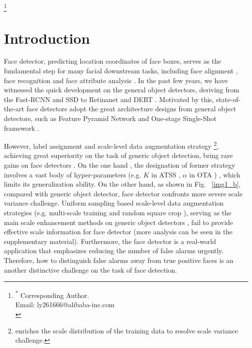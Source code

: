 \documentclass[10pt,twocolumn,letterpaper]{article}
\newcommand\blfootnote[1]{\begingroup
\renewcommand\thefootnote{}\footnote{#1}\addtocounter{footnote}{-1}\endgroup
}
\begin{document}
\blfootnote{\textsuperscript{*} Corresponding Author. \\
\qquad Email:  ly261666@alibaba-inc.com\\
} 
\section{Introduction}

\label{sec:introduction}
Face detector, predicting location coordinates of face boxes, serves as the fundamental step for many facial downstream tasks, including face alignment \cite{bulat2017far}, face recognition \cite{deng1801arcface} \cite{wang2021efficient} and face attribute analysis \cite{shu2021learning}. In the past few years, we have witnessed the quick development on the general object detectors, deriving from the Fast-RCNN \cite{girshick2015fast} and SSD \cite{liu2016ssd} to Retinanet \cite{lin2017focal} and DERT \cite{carion2020end}. 
Motivated by this, 
 state-of-the-art face detectors adopt the great architecture designs from general object detectors, such as Feature Pyramid Network \cite{lin2017feature} and One-stage Single-Shot framework \cite{lin2017focal}. 


However, label assignment and scale-level data augmentation strategy \footnote{enriches the scale distribution of the training data to resolve scale variance challenge.}, achieving great superiority on the task of generic object detection, bring rare gains on face detectors . On the one hand , the designation of former strategy involves a vast body of hyper-parameters (e.g. $K$ in ATSS \cite{zhang2020bridging}, $\alpha$ in OTA \cite{ge2021ota} ) , which limits its generalization ability.
 On the other hand, as shown in Fig. ~\ref{img1_b}, compared with generic object detector, face detector confronts more severe scale variance challenge. Uniform sampling based scale-level data augmentation strategies (e.g. multi-scale training  and random square crop \cite{liu2016ssd}), serving as the main scale enhancement methods on generic object detectors \cite{ren2015faster, lin2017focal, zhang2020bridging},  fail to provide effective scale information for face detector (more analysis can be seen in the supplementary material).
Furthermore, the face detector is a real-world application that emphasizes reducing the number of false alarms urgently. Therefore, how to distinguish false alarms away from true positive faces is an another distinctive challenge on the task of face detection.
 
\end{document}
